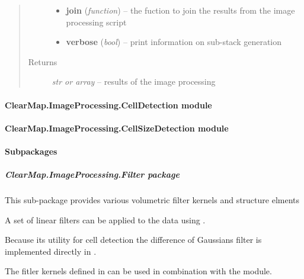 \documentclass[letterpaper,10pt,english]{sphinxmanual}
\begin{document}
\begin{fulllineitems}
\begin{quote}
\begin{description}
\begin{itemize}
\item {} 
\textbf{join} (\emph{function}) --
the fuction to join the results from the image processing script

\item {} 
\textbf{verbose} (\emph{bool}) --
print information on sub-stack generation

\end{itemize}

\item[{Returns}] \leavevmode
\emph{str or array} --
results of the image processing

\end{description}\end{quote}

\end{fulllineitems}



\paragraph{ClearMap.ImageProcessing.CellDetection module}
\label{api/ClearMap.ImageProcessing:clearmap-imageprocessing-celldetection-module}

\paragraph{ClearMap.ImageProcessing.CellSizeDetection module}
\label{api/ClearMap.ImageProcessing:clearmap-imageprocessing-cellsizedetection-module}

\paragraph{Subpackages}
\label{api/ClearMap.ImageProcessing:subpackages}

\subparagraph{ClearMap.ImageProcessing.Filter package}
\label{api/ClearMap.ImageProcessing.Filter:module-ClearMap.ImageProcessing.Filter}\label{api/ClearMap.ImageProcessing.Filter::doc}\label{api/ClearMap.ImageProcessing.Filter:clearmap-imageprocessing-filter-package}
This sub-package provides various volumetric filter kernels and structure elments

A set of linear filters can be applied to the data using
.

Because its utility for cell detection the difference of Gaussians filter
is implemented directly in .

The fitler kernels defined in {\hyperref[api/ClearMap.ImageProcessing.Filter:module-ClearMap.ImageProcessing.Filter.FilterKernel]{\emph{}}}
can be used in combination with the 
module.
\end{document}
